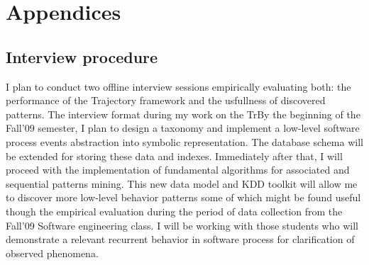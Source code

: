 \chapter{Appendices} \label{appendix}

\section{Interview procedure}
I plan to conduct two offline interview sessions empirically evaluating both: the performance of the Trajectory framework and the usfullness of discovered patterns. The interview format during my work on the TrBy the beginning of the Fall'09 semester, I plan to design a taxonomy and implement a low-level software process events abstraction into symbolic representation. The database schema will be extended for storing these data and indexes. Immediately after that, I will proceed with the implementation of fundamental algorithms for associated and sequential patterns mining. This new data model and KDD toolkit will allow me to discover more low-level behavior patterns some of which might be found useful though the empirical evaluation during the period of data collection from the Fall'09 Software engineering class. I will be working with those students who will demonstrate a relevant recurrent behavior in software process for clarification of observed phenomena.

\newpage
